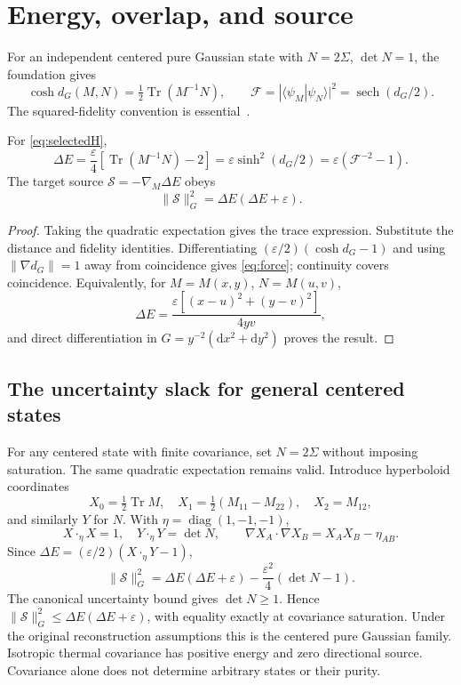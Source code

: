 \documentclass[11pt]{article}
\newcommand{\Tr}{\operatorname{Tr}}\newcommand{\dd}{\mathrm d}
\newcommand{\sech}{\operatorname{sech}}\newcommand{\arcosh}{\operatorname{arcosh}}
\begin{document}
\section{Energy, overlap, and source}
For an independent centered pure Gaussian state with $N=2\Sigma$, $\det N=1$, the foundation gives
\[
\cosh d_G(M,N)=\tfrac12\Tr(M^{-1}N),\qquad
\mathcal F=|\langle\psi_M|\psi_N\rangle|^2=\sech(d_G/2).
\]
The squared-fidelity convention is essential~\cite{Banchi}.

\begin{proposition}\label{prop:energy}
For \eqref{eq:selectedH},
\begin{equation}\label{eq:energy}
\boxed{\Delta E=\frac\varepsilon4[\Tr(M^{-1}N)-2]
=\varepsilon\sinh^2(d_G/2)=\varepsilon(\mathcal F^{-2}-1).}
\end{equation}
The target source $\mathcal S=-\nabla_M\Delta E$ obeys
\begin{equation}\label{eq:force}
\boxed{\|\mathcal S\|_G^2=\Delta E(\Delta E+\varepsilon).}
\end{equation}
\end{proposition}
\begin{proof}
Taking the quadratic expectation gives the trace expression. Substitute the distance and fidelity identities. Differentiating $(\varepsilon/2)(\cosh d_G-1)$ and using $\|\nabla d_G\|=1$ away from coincidence gives \eqref{eq:force}; continuity covers coincidence. Equivalently, for $M=M(x,y)$, $N=M(u,v)$,
\begin{equation}\label{eq:coordinateE}
\Delta E=\frac{\varepsilon[(x-u)^2+(y-v)^2]}{4yv},
\end{equation}
and direct differentiation in $G=y^{-2}(\dd x^2+\dd y^2)$ proves the result.
\end{proof}

\subsection{The uncertainty slack for general centered states}
For any centered state with finite covariance, set $N=2\Sigma$ without imposing saturation. The same quadratic expectation remains valid. Introduce hyperboloid coordinates
\[
X_0=\tfrac12\Tr M,\quad X_1=\tfrac12(M_{11}-M_{22}),\quad X_2=M_{12},
\]
and similarly $Y$ for $N$. With $\eta=\operatorname{diag}(1,-1,-1)$,
\[
X\cdot_\eta X=1,\quad Y\cdot_\eta Y=\det N,\qquad
\nabla X_A\cdot\nabla X_B=X_AX_B-\eta_{AB}.
\]
Since $\Delta E=(\varepsilon/2)(X\cdot_\eta Y-1)$,
\begin{equation}\label{eq:slack}
\boxed{\|\mathcal S\|_G^2=\Delta E(\Delta E+\varepsilon)
-\frac{\varepsilon^2}{4}(\det N-1).}
\end{equation}
The canonical uncertainty bound gives $\det N\ge1$. Hence $\|\mathcal S\|_G^2\le\Delta E(\Delta E+\varepsilon)$, with equality exactly at covariance saturation. Under the original reconstruction assumptions this is the centered pure Gaussian family. Isotropic thermal covariance has positive energy and zero directional source. Covariance alone does not determine arbitrary states or their purity.
\end{document}
